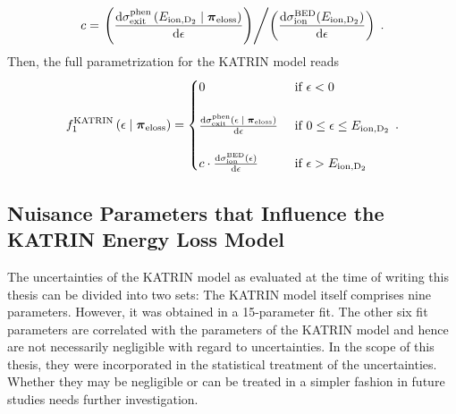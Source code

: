 \begin{equation}
c = \left.	
	\left(
		\katrinElossPhen{\ionEnergyDeu}
	\right)
\middle/
	\left(
		\katrinElossBDE{\ionEnergyDeu}
	\right)
\right.
\fullstop
\end{equation}
Then, the full parametrization for the KATRIN model reads~\cite{Hannen2019_1}
\begin{equation}
	f_1^\mathrm{KATRIN}
	\giventhat*{\epsilon}{\nuisanceParamVec_\mathrm{eloss}} = 
	\begin{cases}
	0
	&\text{ if } \epsilon < 0 \\
	\vphantom{\scriptscriptstyle .} & \\
	\katrinElossPhen{\epsilon}
	&\text{ if } 0 \leq \epsilon \leq E_\mathrm{ion,D_2} \\
	\vphantom{\scriptscriptstyle .} & \\
	c \cdot \katrinElossBDE{\epsilon} 
	&\text{ if } \epsilon > E_\mathrm{ion,D_2}
	\end{cases}
	\fullstop
\end{equation}

\subsection{Nuisance Parameters that Influence the KATRIN Energy Loss Model}
The uncertainties of the KATRIN model as evaluated at the time of writing this thesis can be divided into two sets: The KATRIN model itself comprises nine parameters. However, it was obtained in a 15-parameter fit. The other six fit parameters are correlated with the parameters of the KATRIN model and hence are not necessarily negligible with regard to uncertainties. In the scope of this thesis, they were incorporated in the statistical treatment of the uncertainties. Whether they may be negligible or can be treated in a simpler fashion in future studies needs further investigation. 


